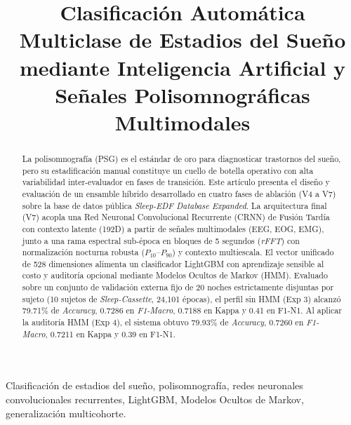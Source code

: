\documentclass[conference]{IEEEtran}
\begin{document}
\title{Clasificación Automática Multiclase de Estadios del Sueño mediante Inteligencia Artificial y Señales Polisomnográficas Multimodales}

\author{
}

\maketitle

\begin{abstract}
La polisomnografía (PSG) es el estándar de oro para diagnosticar trastornos del sueño, pero su estadificación manual constituye un cuello de botella operativo con alta variabilidad inter-evaluador en fases de transición. Este artículo presenta el diseño y evaluación de un ensamble híbrido desarrollado en cuatro fases de ablación (V4 a V7) sobre la base de datos pública \textit{Sleep-EDF Database Expanded}. La arquitectura final (V7) acopla una Red Neuronal Convolucional Recurrente (CRNN) de Fusión Tardía con contexto latente (192D) a partir de señales multimodales (EEG, EOG, EMG), junto a una rama espectral sub-época en bloques de 5 segundos (\textit{rFFT}) con normalización nocturna robusta ($P_{10}$--$P_{90}$) y contexto multiescala. El vector unificado de 528 dimensiones alimenta un clasificador LightGBM con aprendizaje sensible al costo y auditoría opcional mediante Modelos Ocultos de Markov (HMM). Evaluado sobre un conjunto de validación externa fijo de 20 noches estrictamente disjuntas por sujeto (10 sujetos de \textit{Sleep-Cassette}, 24,101 épocas), el perfil sin HMM (Exp 3) alcanzó 79.71\% de \textit{Accuracy}, 0.7286 en \textit{F1-Macro}, 0.7188 en Kappa y 0.41 en F1-N1. Al aplicar la auditoría HMM (Exp 4), el sistema obtuvo 79.93\% de \textit{Accuracy}, 0.7260 en \textit{F1-Macro}, 0.7211 en Kappa y 0.39 en F1-N1.
\end{abstract}

\begin{IEEEkeywords}
Clasificación de estadios del sueño, polisomnografía, redes neuronales convolucionales recurrentes, LightGBM, Modelos Ocultos de Markov, generalización multicohorte.
\end{IEEEkeywords}
\end{document}
